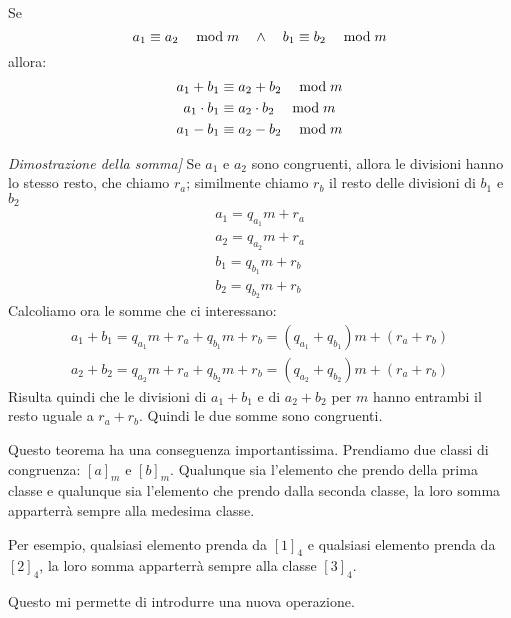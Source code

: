     \begin{teorema}
        Se
        \begin{equation*}
             a_1 \equiv a_2 \quad\bmod m  \quad\land\quad  b_1 \equiv b_2 \quad\bmod m 
        \end{equation*}
        allora:
        \begin{gather*}
             a_1 + b_1 \equiv a_2 + b_2 \quad\bmod m  \\
             a_1 \cdot b_1 \equiv a_2 \cdot b_2 \quad\bmod m  \\
             a_1 - b_1 \equiv a_2 - b_2 \quad\bmod m  
        \end{gather*}
    \end{teorema}
    \begin{dimostrazione}
        \emph{Dimostrazione della somma]}
        Se $a_1$ e $a_2$ sono congruenti, allora le divisioni hanno lo stesso resto, che chiamo $r_a$;
        similmente chiamo $r_b$ il resto delle divisioni di $b_1$ e $b_2$
        \begin{gather*}
            a_1 = q_{a_1} m + r_a \\
            a_2 = q_{a_2} m + r_a \\
            b_1 = q_{b_1} m + r_b \\
            b_2 = q_{b_2} m + r_b 
        \end{gather*}
        Calcoliamo ora le somme che ci interessano:
        \begin{gather*}
            a_1 + b_1 = q_{a_1} m + r_a + q_{b_1} m + r_b = (q_{a_1} + q_{b_1}) m + (r_a + r_b) \\
            a_2 + b_2 = q_{a_2} m + r_a + q_{b_2} m + r_b = (q_{a_2} + q_{b_2}) m + (r_a + r_b) 
        \end{gather*}
        Risulta quindi che le divisioni di $a_1 + b_1$ e di $a_2 + b_2$ per $m$ hanno entrambi il resto uguale a $r_a + r_b$. Quindi le due somme sono congruenti.
    \end{dimostrazione}

Questo teorema ha una conseguenza importantissima. Prendiamo due classi di congruenza: $[a]_m$ e $[b]_m$. Qualunque sia l'elemento che prendo della prima classe e qualunque sia l'elemento che prendo dalla seconda classe, la loro somma apparterrà sempre alla medesima classe.

Per esempio, qualsiasi elemento prenda da $[1]_4$ e qualsiasi elemento prenda da $[2]_4$, la loro somma apparterrà sempre alla classe $[3]_4$. 

Questo mi permette di introdurre una nuova operazione.

